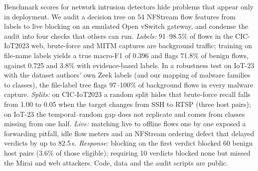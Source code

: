 Benchmark scores for network intrusion detectors hide problems that appear only in deployment. We audit a decision tree on 54 NFStream flow features from labels to live blocking on an emulated Open vSwitch gateway, and condense the audit into four checks that others can run. \emph{Labels:} 91--98.5\% of flows in the CIC-IoT2023 web, brute-force and MITM captures are background traffic; training on file-name labels yields a true macro-F1 of 0.396 and flags 71.8\% of benign flows, against 0.725 and 3.8\% with evidence-based labels. In a robustness test on IoT-23 with the dataset authors' own Zeek labels (and our mapping of malware families to classes), the file-label tree flags 97--100\% of background flows in every malware capture. \emph{Splits:} on CIC-IoT2023 a random split hides that brute-force recall falls from 1.00 to 0.05 when the target changes from SSH to RTSP (three host pairs); on IoT-23 the temporal--random gap does not replicate and comes from classes missing from one half. \emph{Live:} matching live to offline flows one by one exposed a forwarding pitfall, idle flow meters and an NFStream ordering defect that delayed verdicts by up to 82.5\,s. \emph{Response:} blocking on the first verdict blocked 60 benign host pairs (3.6\% of those eligible); requiring 10 verdicts blocked none but missed the Mirai and web attackers. Code, data and the audit scripts are public.

